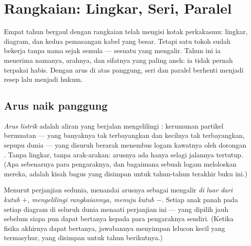 \chapter{Rangkaian: Lingkar, Seri, Paralel}\label{ch:g7:circuits-series-parallel}

Empat tahun bergaul dengan rangkaian telah mengisi kotak
perkakasmu: lingkar, diagram, dan kedua pemasangan kabel yang besar.
Tetapi satu tokoh sudah bekerja tanpa nama sejak semula --- sesuatu
yang mengalir. Tahun ini ia menerima namanya, arahnya, dan sifatnya
yang paling aneh: ia tidak pernah terpakai habis. Dengan arus di atas
panggung, seri dan paralel berhenti menjadi resep lalu menjadi hukum.

\section{Arus naik panggung}

\begin{definition}\label{def:g7:circuits-series-parallel:current}
\emph{Arus listrik} adalah aliran yang berjalan
mengelilingi : kerumunan partikel bermuatan ---
yang banyaknya tak terbayangkan dan kecilnya tak terbayangkan, sepupu
dunia  --- yang disuruh berarak menembus logam kawatnya oleh dorongan
. Tanpa lingkar, tanpa arak-arakan: arusnya ada hanya selagi
jalannya tertutup. (Apa sebenarnya para pengaraknya, dan bagaimana
sebuah logam meloloskan mereka, adalah kisah bagus yang disimpan untuk
tahun-tahun terakhir buku ini.)
\end{definition}

\begin{proposition}\label{prop:g7:circuits-series-parallel:direction}
Menurut perjanjian sedunia,  menandai arusnya sebagai
mengalir \emph{di luar  dari kutub $+$, mengelilingi
rangkaiannya, menuju kutub $-$}. Setiap anak panah pada setiap diagram
di seluruh dunia menaati perjanjian ini --- yang dipilih jauh sebelum
siapa pun dapat bertanya kepada para pengaraknya sendiri. (Ketika
fisika akhirnya dapat bertanya, jawabannya menyimpan lelucon kecil
yang termasyhur, yang disimpan untuk tahun berikutnya.)
\end{proposition}

